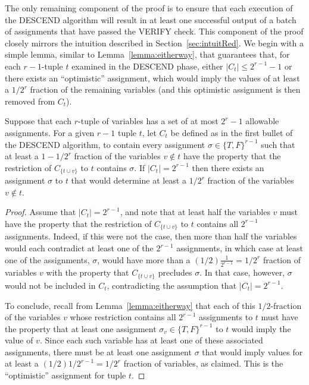 \documentclass[anon,12pt]{colt2018}
\begin{document}
The only remaining component of the proof is to ensure that each execution of the DESCEND algorithm will result in at least one successful output of a batch of assignments that have passed the VERIFY check.  This component of the proof closely mirrors the intuition described in Section~\ref{sec:intuitRed}.   We begin with a simple lemma, similar to Lemma~\ref{lemma:eitherway}, that guarantees that, for each $r-1$-tuple $t$ examined in the DESCEND phase, either $|C_t| \le 2^{r-1}-1$ or there exists an ``optimistic'' assignment, which would imply the values of at least a $1/2^r$ fraction of the remaining variables (and this optimistic assignment is then removed from $C_t$).

\begin{lemma}\label{lemma:eitherway2}
 Suppose that each $r$-tuple of variables has a set of at most $2^r-1$ allowable assignments.  For a given $r-1$ tuple $t$, let $C_t$ be defined as in the first bullet of the DESCEND algorithm, to contain every assignment $\sigma \in \{T,F\}^{r-1}$ such that at least a $1-1/2^r$ fraction of the variables $v \not \in t$ have the property that the restriction of $C_{\{t \cup v\}}$ to $t$ contains $\sigma.$  If $|C_t| = 2^{r-1}$ then there exists an assignment $\sigma$ to $t$ that would determine at least a $1/2^r$ fraction of the variables $v \not \in t$.
\end{lemma}
\begin{proof}
Assume that $|C_t|=2^{r-1}$, and note that at least half the variables $v$ must have the property that the restriction of $C_{\{t\cup v\}}$ to $t$ contains all $2^{r-1}$ assignments.  Indeed, if this were not the case, then more than half the variables would each contradict at least one of the $2^{r-1}$ assignments, in which case at least one of the assignments, $\sigma$, would have more than a $(1/2)\frac{1}{2^{r-1}}=1/2^r$ fraction of variables $v$ with the property that $C_{\{t \cup v\}}$ precludes $\sigma$.  In that case, however, $\sigma$ would not be included in $C_t$, contradicting the assumption that $|C_t|=2^{r-1}$.   

To conclude, recall from Lemma~\ref{lemma:eitherway} that each of this $1/2$-fraction of the variables $v$ whose restriction contains all $2^{r-1}$ assignments to $t$ must have the property that at least one assignment $\sigma_v \in \{T,F\}^{r-1}$ to $t$ would imply the value of $v$.  Since each such variable has at least one of these associated assignments, there must be at least one assignment $\sigma$ that would imply values for at least a $(1/2)1/2^{r-1}=1/2^r$ fraction of variables, as claimed.  This is the ``optimistic'' assignment for tuple $t$.
\end{proof}
\end{document}
